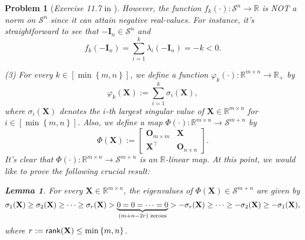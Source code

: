 \documentclass[11pt]{article}
\newtheorem{lemma}{Lemma}
\newtheorem{problem}{Problem}
\numberwithin{equation}{problem}
\begin{document}
\begin{problem} [\emph{Exercise 11.7} in \cite{calafiore2014optimization}]
{\indent However, the function $f_k (\cdot) : \mathcal{S}^n \rightarrow \mathbb{R}$ is NOT a norm on $\mathcal{S}^n$ since it can attain negative real-values. For instance, it's straightforward to see that $- \mathbf{I}_n \in \mathcal{S}^n$ and
\begin{equation*}
    f_k \left( - \mathbf{I}_n \right)
    = \sum_{i=1}^{k} \lambda_i \left( - \mathbf{I}_n \right) 
    = - k < 0.
\end{equation*}

\indent (3) For every $k \in \left[ \min \left\{ m, n \right\} \right]$, we define a function $\varphi_k (\cdot) : \mathbb{R}^{m \times n} \rightarrow \mathbb{R}_{+}$ by
\begin{equation*}
    \varphi_k (\mathbf{X}) := \sum_{i=1}^{k} \sigma_i (\mathbf{X}),
\end{equation*}
where $\sigma_i (\mathbf{X})$ denotes the $i$-th largest singular value of $\mathbf{X} \in \mathbb{R}^{m \times n}$ for $i \in \left[ \min \left\{ m, n \right\} \right]$. Also, we define a map $\Phi(\cdot) : \mathbb{R}^{m \times n} \rightarrow \mathcal{S}^{m + n}$ by
\begin{equation*}
    \Phi (\mathbf{X}) :=
    \begin{bmatrix}
        \mathbf{O}_{m \times m} & \mathbf{X} \\
        \mathbf{X}^{\top} & \mathbf{O}_{n \times n}
    \end{bmatrix}.
\end{equation*}
It's clear that $\Phi(\cdot) : \mathbb{R}^{m \times n} \rightarrow \mathcal{S}^{m + n}$ is an $\mathbb{R}$-linear map. At this point, we would like to prove the following crucial result:

\begin{lemma}
\label{lemma1}
For every $\mathbf{X} \in \mathbb{R}^{m \times n}$, the eigenvalues of $\Phi (\mathbf{X}) \in \mathcal{S}^{m + n}$ are given by
\begin{equation}
    \label{eqn2.4}
    \sigma_1 (\mathbf{X}) \geq \sigma_2 (\mathbf{X}) \geq \cdots \geq \sigma_r (\mathbf{X}) > 
    \underbrace{0 = 0 = \cdots = 0}_{(m+n - 2r) \textnormal{ zeroes}} > - \sigma_r (\mathbf{X}) \geq \cdots \geq - \sigma_2 (\mathbf{X})
    \geq - \sigma_1 (\mathbf{X}),
\end{equation}
where $r := \textnormal{\textsf{rank}}(\mathbf{X}) \leq \min \left\{ m, n \right\}$.
\end{lemma}

}
\end{problem}
\end{document}
